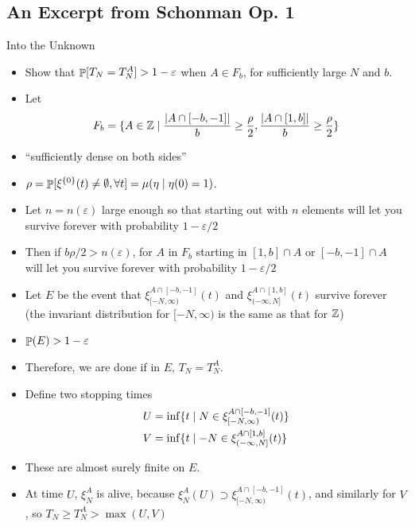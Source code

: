 \documentclass{beamer}
\newcommand{\ep}{\varepsilon}
\newcommand{\ignore}[1]{}
\newcommand{\rb}{\ignore{[}]}
\begin{document}
\subsection{An Excerpt from Schonman Op. 1}

\begin{frame}{Into the Unknown}
  \begin{itemize}
    \item Show that $\Prob[T_{N} = T_{N}^{A}] > 1 - \ep$ when $A \in F_{b}$, for sufficiently large $N$ and $b$.
    \item Let
          \[F_{b} = \{A \in \mathbb{Z} \mid \frac{\abs{A \cap [-b,-1]}}{b} \geq \frac{\rho}{2}, \frac{\abs{A \cap [1,b]}}{b} \geq \frac{\rho}{2}\}\]
    \item ``sufficiently dense on both sides''
    \item $\rho = \mathop{\mathbb{P}}[\xi^{\{0\}}(t) \neq \emptyset, \forall t] = \mu(\eta \mid \eta(0) = 1)$.
  \end{itemize}
\end{frame}

\begin{frame}
  \begin{itemize}
    \item Let $n = n(\ep)$ large enough so that starting out with $n$ elements will let you survive forever with probability $1 - \ep/2$
          \pause
    \item Then if $b \rho/2 > n(\ep)$, for $A$ in $F_{b}$ starting in $[1,b] \cap A$ or $[-b,-1] \cap A$ will let you survive forever with probability $1 - \ep/2$
          \pause
    \item Let $E$ be the event that $\xi_{[-N,\infty)}^{A\cap[-b,-1]}(t)$ and $\xi_{(-\infty,N]}^{A \cap [1,b]}(t)$ survive forever (the invariant distribution for $[-N,\infty)$ is the same as that for $\mathbb{Z}$)
          \pause
    \item $\Prob(E) > 1 - \ep$
          \pause
    \item Therefore, we are done if in $E$, $T_{N} = T_{N}^{A}$.
  \end{itemize}
\end{frame}

\begin{frame}
  \begin{itemize}
    \item Define two stopping times
    \begin{align*}
      U &= \inf\set{t \st N \in \xi_{[-N,\infty)}^{A \cap [-b,-1]}(t)} \\
      V &= \inf\set{t \st -N \in \xi_{(-\infty,N\rb}^{A \cap [1,b]}(t)}
    \end{align*}
    \item These are almost surely finite on $E$.
    \item At time $U$, $\xi_{N}^{A}$ is alive, because $\xi_{N}^{A}(U) \supset \xi_{[-N,\infty)}^{A \cap [-b,-1]}(t)$, and similarly for $V$, so $T_{N} \geq T_{N}^{A} > \max(U,V)$
  \end{itemize}
\end{frame}
\end{document}
